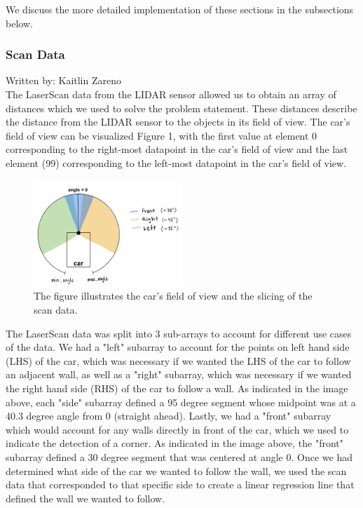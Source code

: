 \documentclass{article}
\begin{document}
We discuss the more detailed implementation of these sections in the subsections below.

\subsubsection{Scan Data}
Written by: Kaitlin Zareno\\

The LaserScan data from the LIDAR sensor allowed us to obtain an array of distances which we  used to solve the problem statement. These distances describe the distance from the LIDAR sensor to the objects in its field of view. The car's field of view can be visualized Figure 1, with the first value at element 0 corresponding to the right-most datapoint in the car's field of view and the last element (99) corresponding to the left-most datapoint in the car's field of view. \\

\begin{figure}[h]
\begin{center}
\includegraphics[width=0.5\textwidth]{imgs/IMG_0304.jpg} %
\caption{The figure illustrates the car's field of view and the slicing of the scan data.}
\end{center}
\end{figure}

The LaserScan data was split into 3 sub-arrays to account for different use cases of the data. We had a "left" subarray to account for the points on left hand side (LHS) of the car, which was necessary if we wanted the LHS of the car to follow an adjacent wall, as well as a "right" subarray, which was necessary if we wanted the right hand side (RHS) of the car to follow a wall. As indicated in the image above, each "side" subarray defined a 95 degree segment whose midpoint was at a 40.3 degree angle from 0 (straight ahead). Lastly, we had a "front" subarray which would account for any walls directly in front of the car, which we used to indicate the detection of a corner. As indicated in the image above, the "front" subarray defined a 30 degree segment that was centered at angle 0. Once we had determined what side of the car we wanted to follow the wall, we used the scan data that corresponded to that specific side to create a linear regression line that defined the wall we wanted to follow. 
\end{document}
